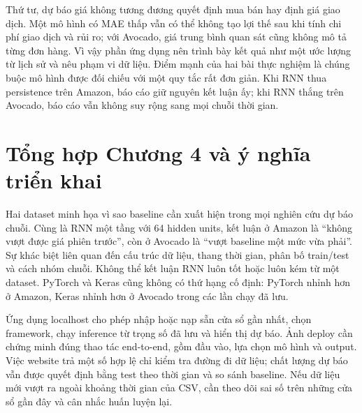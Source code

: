 \documentclass[12pt,a4paper]{report}
\begin{document}
Thứ tư, dự báo giá không tương đương quyết định mua bán hay định giá giao dịch. Một mô hình có MAE thấp vẫn có thể không tạo lợi thế sau khi tính chi phí giao dịch và rủi ro; với Avocado, giá trung bình quan sát cũng không mô tả từng đơn hàng. Vì vậy phần ứng dụng nên trình bày kết quả như một ước lượng từ lịch sử và nêu phạm vi dữ liệu. Điểm mạnh của hai bài thực nghiệm là chúng buộc mô hình được đối chiếu với một quy tắc rất đơn giản. Khi RNN thua persistence trên Amazon, báo cáo giữ nguyên kết luận ấy; khi RNN thắng trên Avocado, báo cáo vẫn không suy rộng sang mọi chuỗi thời gian.

\section{Tổng hợp Chương 4 và ý nghĩa triển khai}
Hai dataset minh họa vì sao baseline cần xuất hiện trong mọi nghiên cứu dự báo chuỗi. Cùng là RNN một tầng với 64 hidden units, kết luận ở Amazon là ``không vượt được giá phiên trước'', còn ở Avocado là ``vượt baseline một mức vừa phải''. Sự khác biệt liên quan đến cấu trúc dữ liệu, thang thời gian, phân bố train/test và cách nhóm chuỗi. Không thể kết luận RNN luôn tốt hoặc luôn kém từ một dataset. PyTorch và Keras cũng không có thứ hạng cố định: PyTorch nhỉnh hơn ở Amazon, Keras nhỉnh hơn ở Avocado trong các lần chạy đã lưu.

Ứng dụng localhost cho phép nhập hoặc nạp sẵn cửa sổ gần nhất, chọn framework, chạy inference từ trọng số đã lưu và hiển thị dự báo. Ảnh deploy cần chứng minh đúng thao tác end-to-end, gồm đầu vào, lựa chọn mô hình và output. Việc website trả một số hợp lệ chỉ kiểm tra đường đi dữ liệu; chất lượng dự báo vẫn được quyết định bằng test theo thời gian và so sánh baseline. Nếu dữ liệu mới vượt ra ngoài khoảng thời gian của CSV, cần theo dõi sai số trên những cửa sổ gần đây và cân nhắc huấn luyện lại.
\end{document}

